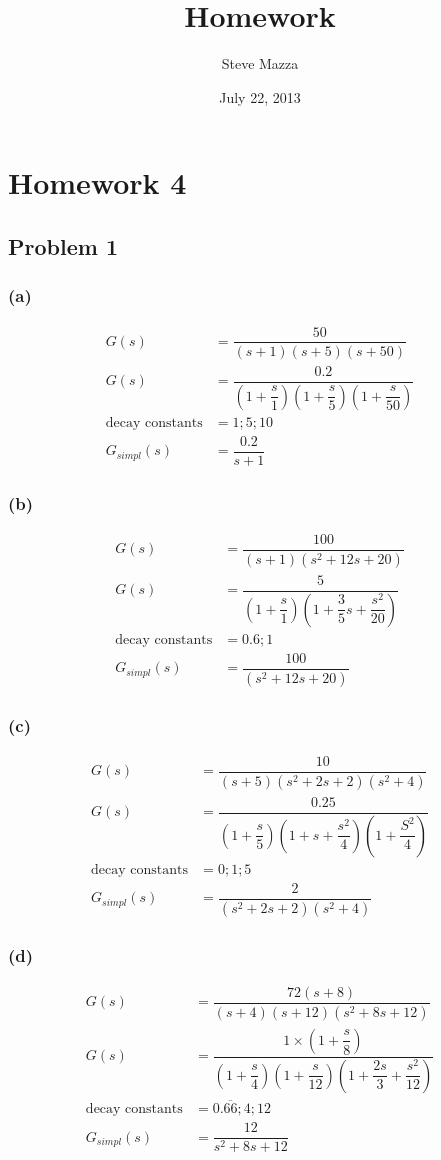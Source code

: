 \documentclass[letterpaper,10pt]{article}
\title{Homework}
\author{Steve Mazza}
\date{July 22, 2013}
\begin{document}
\maketitle

\section*{Homework 4}
\subsection*{Problem 1}
\subsubsection*{(a)}
\begin{align*}
	G(s) &= \dfrac{50}{(s+1)(s+5)(s+50)} \\
	G(s) &= \dfrac{0.2}{\left(1+\dfrac{s}{1}\right)\left(1 + \dfrac{s}{5}\right)\left(1 + \dfrac{s}{50}\right)} \\
	\mbox{decay constants} &= 1;5;10 \\
	G_{simpl}(s) &= \dfrac{0.2}{s+1}
\end{align*}
\subsubsection*{(b)}
\begin{align*}
	G(s) &= \dfrac{100}{(s+1)(s^2+12s+20)} \\
	G(s) &= \dfrac{5}{\left(1+\dfrac{s}{1}\right)\left(1+\dfrac{3}{5}s+\dfrac{s^2}{20}\right)} \\
	\mbox{decay constants} &= 0.6;1\\
	G_{simpl}(s) &= \dfrac{100}{\left(s^2+12s+20\right)}
\end{align*}
\subsubsection*{(c)}
\begin{align*}
	G(s) &= \dfrac{10}{(s+5)(s^2+2s+2)(s^2+4)} \\
	G(s) &= \dfrac{0.25}{\left(1+\dfrac{s}{5}\right)\left(1+s+\dfrac{s^2}{4}\right)\left(1+\dfrac{S^2}{4}\right)} \\
	\mbox{decay constants} &= 0;1;5 \\
	G_{simpl}(s) &= \dfrac{2}{\left(s^2+2s+2\right)\left(s^2+4\right)}
\end{align*}
\subsubsection*{(d)}
\begin{align*}
	G(s) &= \dfrac{72(s+8)}{(s+4)(s+12)(s^2+8s+12)} \\
	G(s) &= \dfrac{1\times\left(1+\dfrac{s}{8}\right)}{\left(1+\dfrac{s}{4}\right)\left(1+\dfrac{s}{12}\right)\left(1+\dfrac{2s}{3}+\dfrac{s^2}{12}\right)} \\
	\mbox{decay constants} &= 0.\overline{66};4;12 \\
	G_{simpl}(s) &= \dfrac{12}{s^2+8s+12}
\end{align*}
\end{document}
